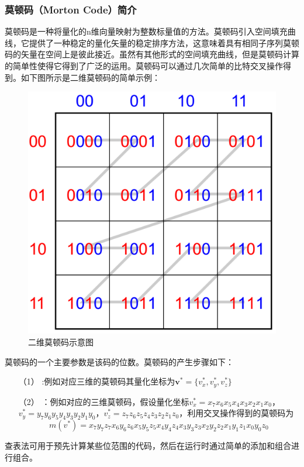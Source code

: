 \documentclass[11pt]{article}
\begin{document}
\subsubsection{莫顿码（Morton Code）简介}
莫顿码是一种将量化的n维向量映射为整数标量值的方法。莫顿码引入空间填充曲线，它提供了一种稳定的量化矢量的稳定排序方法，这意味着具有相同子序列莫顿码的矢量在空间上是彼此接近。虽然有其他形式的空间填充曲线，但是莫顿码计算的简单性使得它得到了广泛的运用。莫顿码可以通过几次简单的比特交叉操作得到。如下图所示是二维莫顿码的简单示例：
\begin{figure}[H]
\begin{center}
\includegraphics[scale=0.4]{morton-code.png}
\caption{二维莫顿码示意图}
\end{center}
\end{figure}

\par 莫顿码的一个主要参数是该码的位数。莫顿码的产生步骤如下：
\begin{itemize}
\item[（1）]{}:例如对应三维的莫顿码其量化坐标为$\bm{v}^{*}=\{v_x^{*},v_y^{*},v_z^{*}\}$

\item[（2）]{}：例如对应的三维莫顿码，假设量化坐标$v_x^{*}=x_7x_6x_5x_4x_3x_2x_1x_0$，$v_y^{*}=y_7y_6y_5y_4y_3y_2y_1y_0$，$v_z^{*}=z_7z_6z_5z_4z_3z_2z_1z_0$，利用交叉操作得到的莫顿码为
$$
m(v^{*})=x_7y_7z_7x_6y_6z_6x_5y_5z_5x_4y_4z_4x_3y_3z_3x_2y_2z_2x_1y_1z_1x_0y_0z_0
$$
\end{itemize}
查表法可用于预先计算某些位范围的代码，然后在运行时通过简单的添加和组合进行组合。
\end{document}
